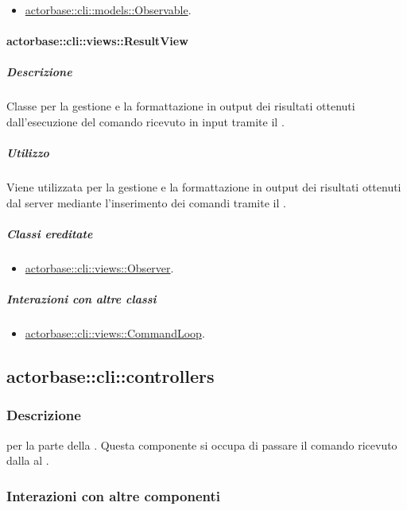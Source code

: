 \documentclass{scalatekids-article}
\begin{document}
\begin{itemize}
\item \hyperref[sec:actorbase::cli::models::Observable]{actorbase::cli::models::Observable}.
\end{itemize}

\paragraph{actorbase::cli::views::ResultView}
\label{sec:actorbase::cli::views::ResultView}

\subparagraph{Descrizione}

Classe per la gestione e la formattazione in output dei risultati ottenuti
dall'esecuzione del comando ricevuto in input tramite il  .

\subparagraph{Utilizzo}

Viene utilizzata per la gestione e la formattazione in output dei risultati
ottenuti dal server mediante l'inserimento dei comandi tramite il
 .

\subparagraph{Classi ereditate}

\begin{itemize}
\item \hyperref[sec:actorbase::cli::views::Observer]{actorbase::cli::views::Observer}.
\end{itemize}

\subparagraph{Interazioni con altre classi}

\begin{itemize}
\item \hyperref[sec:actorbase::cli::views::CommandLoop]{actorbase::cli::views::CommandLoop}.
\end{itemize}

\subsection{actorbase::cli::controllers}
\label{sec:actorbase::cli::controllers}

\subsubsection{Descrizione}

 per la parte  della . Questa
componente si occupa di passare il comando ricevuto dalla  al
.

\subsubsection{Interazioni con altre componenti}
\end{document}
